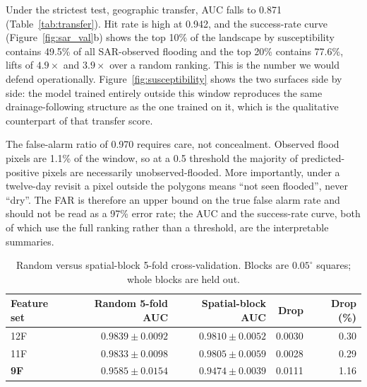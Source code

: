 \documentclass[journal]{IEEEtran}
\begin{document}
Under the strictest test, geographic transfer, AUC falls to 0.871
(Table~\ref{tab:transfer}). Hit rate is high at 0.942, and the success-rate curve
(Figure~\ref{fig:sar_val}b) shows the top 10\% of the landscape by susceptibility
contains 49.5\% of all SAR-observed flooding and the top 20\% contains 77.6\%,
lifts of $4.9\times$ and $3.9\times$ over a random ranking. This is the number we
would defend operationally. Figure~\ref{fig:susceptibility} shows the two
surfaces side by side: the model trained entirely outside this window
reproduces the same drainage-following structure as the one trained on it,
which is the qualitative counterpart of that transfer score.

The false-alarm ratio of 0.970 requires care, not concealment. Observed
flood pixels are 1.1\% of the window, so at a 0.5 threshold the majority of
predicted-positive pixels are necessarily unobserved-flooded. More importantly,
under a twelve-day revisit a pixel outside the polygons means ``not seen
flooded'', never ``dry''. The FAR is therefore an upper bound on the true false
alarm rate and should not be read as a 97\% error rate; the AUC and the
success-rate curve, both of which use the full ranking rather than a threshold,
are the interpretable summaries.

\begin{table}[!t]
\centering\footnotesize
\caption{Random versus spatial-block 5-fold cross-validation. Blocks are
$0.05^\circ$ squares; whole blocks are held out.}
\label{tab:spatial}
\small
\begin{tabular}{@{}lrrrr@{}}
\toprule
\textbf{Feature set} & \textbf{Random 5-fold AUC} & \textbf{Spatial-block AUC} &
\textbf{Drop} & \textbf{Drop (\%)} \\
\midrule
12F & $0.9839\pm0.0092$ & $0.9810\pm0.0052$ & 0.0030 & 0.30 \\
11F & $0.9833\pm0.0098$ & $0.9805\pm0.0059$ & 0.0028 & 0.29 \\
\textbf{9F} & $0.9585\pm0.0154$ & $0.9474\pm0.0039$ & 0.0111 & 1.16 \\
\bottomrule
\end{tabular}
\end{table}
\end{document}
